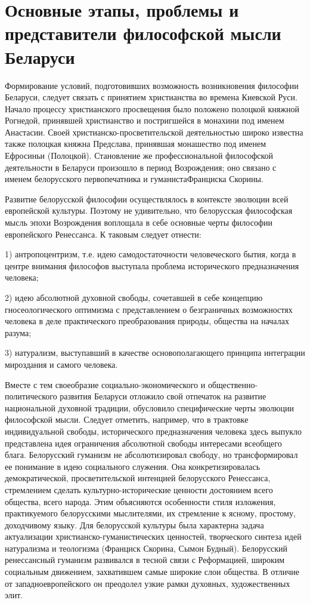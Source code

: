 \section{Основные этапы, проблемы и представители философской мысли Беларуси}
\label{sec:practice}


Формирование условий, подготовивших возможность возникновения философии Беларуси, следует связать с принятием христианства во времена Киевской Руси. Начало процессу христианского просвещения было положено полоцкой княжной Рогнедой, принявшей христианство и постригшейся в монахини под именем Анастасии. Своей христианско-просветительской деятельностью широко известна также полоцкая княжна Предслава, принявшая монашество под именем Ефросиньи (Полоцкой). Становление же профессиональной философской деятельности в Беларуси произошло в период Возрождения; оно связано с именем белорусского первопечатника и гуманистаФранциска Скорины.

Развитие белорусской философии осуществлялось в контексте эволюции всей европейской культуры. Поэтому не удивительно, что белорусская философская мысль эпохи Возрождения воплощала в себе основные черты философии европейского Ренессанса. К таковым следует отнести:

1) антропоцентризм, т.е. идею самодостаточности человеческого бытия, когда в центре внимания философов выступала проблема исторического предназначения человека;

2) идею абсолютной духовной свободы, сочетавшей в себе концепцию гносеологического оптимизма с представлением о безграничных возможностях человека в деле практического преобразования природы, общества на началах разума;

3) натурализм, выступавший в качестве основополагающего принципа интеграции мироздания и самого человека.

Вместе с тем своеобразие социально-экономического и общественно-политического развития Беларуси отложило свой отпечаток на развитие национальной духовной традиции, обусловило специфические черты эволюции философской мысли. Следует отметить, например, что в трактовке индивидуальной свободы, исторического предназначения человека здесь выпукло представлена идея ограничения абсолютной свободы интересами всеобщего блага. Белорусский гуманизм не абсолютизировал свободу, но трансформировал ее понимание в идею социального служения. Она конкретизировалась демократической, просветительской интенцией белорусского Ренессанса, стремлением сделать культурно-исторические ценности достоянием всего общества, всего народа. Этим объясняются особенности стиля изложения, практикуемого белорусскими мыслителями, их стремление к ясному, простому, доходчивому языку. Для белорусской культуры была характерна задача актуализации христианско-гуманистических ценностей, творческого синтеза идей натурализма и теологизма (Франциск Скорина, Сымон Будный). Белорусский ренессансный гуманизм развивался в тесной связи с Реформацией, широким социальным движением, захватившем самые широкие слои общества. В отличие от западноевропейского он преодолел узкие рамки духовных, художественных элит.

